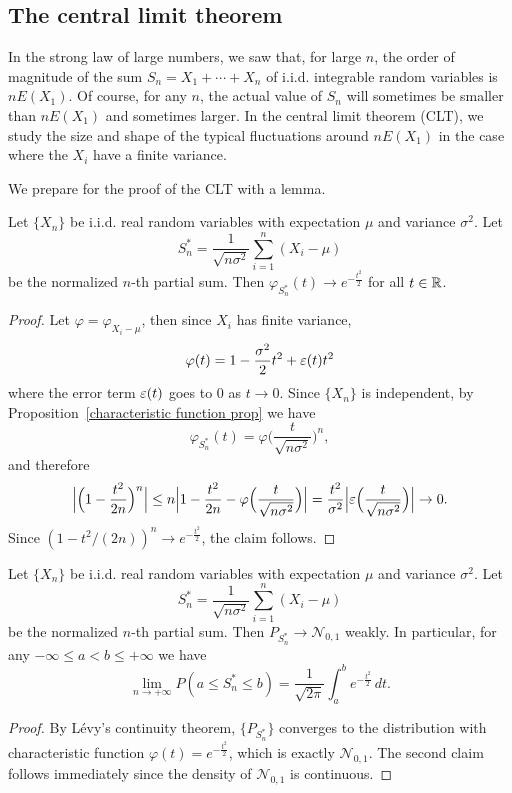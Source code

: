 \subsection{The central limit theorem}
In the strong law of large numbers, we saw that, for large $n$, the order of magnitude of the sum $S_n=X_1+\cdots+X_n$ of i.i.d. integrable random variables is $nE(X_1)$. Of course, for any $n$, the actual value of $S_n$ will sometimes be smaller than $nE(X_1)$ and sometimes larger. In the central limit theorem (CLT), we study the size and shape of the typical fluctuations around $nE(X_1)$ in the case where the $X_i$ have a finite variance.\par
We prepare for the proof of the CLT with a lemma.
\begin{lemma}
Let $\{X_n\}$ be i.i.d. real random variables with expectation $\mu$ and variance $\sigma^2$. Let
\[S_n^*=\frac{1}{\sqrt{n\sigma^2}}\sum_{i=1}^{n}(X_i-\mu)\]
be the normalized $n$-th partial sum. Then $\varphi_{S_n^*}(t)\to e^{-\frac{t^2}{2}}$ for all $t\in\mathbb{R}$. 
\end{lemma}
\begin{proof}
Let $\varphi=\varphi_{X_i-\mu}$, then since $X_i$ has finite variance,
\[\varphi(t)=1-\frac{\sigma^2}{2}t^2+\varepsilon(t)t^2\]
where the error term $\varepsilon(t)$ goes to $0$ as $t\to 0$. Since $\{X_n\}$ is independent, by Proposition~\ref{characteristic function prop} we have
\[\varphi_{S_n^*}(t)=\varphi\Big(\frac{t}{\sqrt{n\sigma^2}}\Big)^n,\]
and therefore
\begin{align*}
\Big|\Big(1-\frac{t^2}{2n}\Big)^n\Big|\leq n\Big|1-\frac{t^2}{2n}-\varphi\Big(\frac{t}{\sqrt{n\sigma^2}}\Big)\Big|=\frac{t^2}{\sigma^2}\Big|\varepsilon\Big(\frac{t}{\sqrt{n\sigma^2}}\Big)\Big|\to 0.
\end{align*}
Since $(1-t^2/(2n))^n\to e^{-\frac{t^2}{2}}$, the claim follows.
\end{proof}
\begin{theorem}\label{CLT for iid}
Let $\{X_n\}$ be i.i.d. real random variables with expectation $\mu$ and variance $\sigma^2$. Let
\[S_n^*=\frac{1}{\sqrt{n\sigma^2}}\sum_{i=1}^{n}(X_i-\mu)\]
be the normalized $n$-th partial sum. Then $P_{S_n^*}\to \mathcal{N}_{0,1}$ weakly. In particular, for any $-\infty\leq a<b\leq+\infty$ we have
\[\lim_{n\to+\infty}P(a\leq S_n^*\leq b)=\frac{1}{\sqrt{2\pi}}\int_a^be^{-\frac{t^2}{2}}\,dt.\]
\end{theorem}
\begin{proof}
By L\'evy's continuity theorem, $\{P_{S_n^*}\}$ converges to the distribution with characteristic function $\varphi(t)=e^{-\frac{t^2}{2}}$, which is exactly $\mathcal{N}_{0,1}$. The second claim follows immediately since the density of $\mathcal{N}_{0,1}$ is continuous.
\end{proof}

